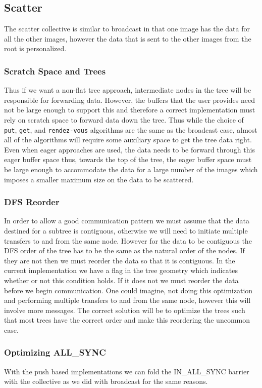 \documentclass[times,10pt]{article}
\begin{document}
 
\subsection{Scatter}
The scatter collective is similar to broadcast in that one image has the data for all the other images, however the data that is sent to the other images from the root is personalized. 

\subsubsection{Scratch Space and Trees}
Thus if we want a non-flat  tree approach, intermediate nodes in the tree will be responsible for forwarding data. However, the buffers that the user provides need not be large enough to support this and therefore a correct implementation must rely on scratch space to forward data down the tree. Thus while the choice of \texttt{put}, \texttt{get}, and \texttt{rendez-vous} algorithms are the same as the broadcast case, almost all of the algorithms will require some auxiliary space to get the tree data right.  Even when eager approaches are used, the data needs to be forward through this eager buffer space thus, towards the top of the tree, the eager buffer space must be large enough to accommodate the data for a large number of the images which imposes a smaller maximum size on the data to be scattered. 

\subsubsection{DFS Reorder}
In order to allow a good communication pattern we must assume that the data destined for a subtree is contiguous, otherwise we will need to initiate multiple transfers to and from the same node. However for the data to be contiguous the DFS order of the tree has to be the same as the natural order of the nodes. If they are not then we must reorder the data so that it is contiguous. In the current implementation we have a flag in the tree geometry which indicates whether or not this condition holds. If it does not we must reorder the data before we begin communication. One could imagine, not doing this optimization and performing multiple transfers to and from the same node, however this will involve more messages. The correct solution will be to optimize the trees such that most trees have the correct order and make this reordering the uncommon case. 

\subsubsection{Optimizing ALL\_SYNC}
With the push based implementations we can fold the IN\_ALL\_SYNC barrier with the collective as we did with broadcast for the same reasons.
\end{document}
